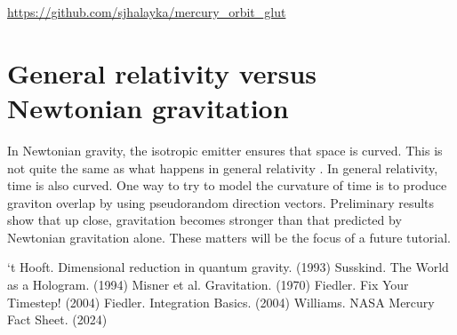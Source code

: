\documentclass[12pt]{article}
\begin{document}
\url{https://github.com/sjhalayka/mercury_orbit_glut}




\section{General relativity versus Newtonian gravitation}

In Newtonian gravity, the isotropic emitter ensures that space is curved.
This is not quite the same as what happens in general relativity \cite{misner}.
In general relativity, time is also curved.
One way to try to model the curvature of time is to produce graviton overlap by using pseudorandom direction vectors.
Preliminary results show that up close, gravitation becomes stronger than that predicted by Newtonian gravitation alone.
These matters will be the focus of a future tutorial.




\pagebreak







\begin{thebibliography}{9}

 `t Hooft. Dimensional reduction in quantum gravity. (1993)
 Susskind. The World as a Hologram. (1994)
 Misner et al. Gravitation. (1970)
 Fiedler. Fix Your Timestep! (2004)
 Fiedler. Integration Basics. (2004)
 Williams. NASA Mercury Fact Sheet. (2024)



\end{thebibliography}
\end{document}
